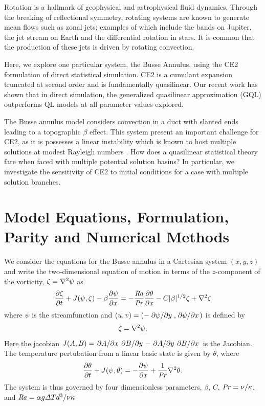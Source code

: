 \documentclass{jfm}
\newcommand{\Rayleigh}{\mbox{\textit{Ra}}}  %
\begin{document}
Rotation is a hallmark of geophysical and astrophysical fluid dynamics.
Through the breaking of reflectional symmetry, rotating systems are known to generate mean flows such as zonal jets; examples of which include the bands on Jupiter, the jet stream on Earth and the differential rotation in stars.
It is common that the production of these jets is driven by rotating convection.


Here, we explore one particular system, the Busse Annulus, using the CE2 formulation of direct statistical simulation.
CE2 is a cumulant expansion truncated at second order and is fundamentally quasilinear.
Our recent work \citep{2018RSPSA.47480422T} has shown that in direct simulation, the generalized quasilinear approximation (GQL) outperforms QL models at all parameter values explored.

The Busse annulus model considers convection in a duct with slanted ends leading to a topographic $\beta$ effect.
This system present an important challenge for CE2, as it is possesses a linear instability which is known to host multiple solutions at modest Rayleigh numbers \citep{bh1993}.
How does a quasilinear statistical theory fare when faced with multiple potential solution basins?
In particular, we investigate the sensitivity of CE2 to initial conditions for a case with multiple solution branches.

\section{Model Equations, Formulation, Parity and Numerical Methods}
\label{sec:model-eqations}

We consider the equations for the Busse annulus \citep[see e.g.][]{bh1993} in a Cartesian system $(x,y,z)$ and write the two-dimensional equation of motion in terms of the $z$-component of the vorticity, $\zeta = \laplacian{\psi}$ as
\begin{equation}
  \label{eq:zeta_eom}
  \pdv{\zeta}{t} + J(\psi, \zeta) - \beta \pdv{\psi}{x} = -\frac{\Rayleigh}{\Pran} \pdv{\theta}{x} -C |\beta|^{1/2} \zeta + \laplacian{\zeta}
\end{equation}
where $\psi$ is the streamfunction and $(u,v) = (-\pdv*{\psi}{y}, \pdv*{\psi}{x})$ is defined by
\begin{equation}
  \label{eq:zeta_def}
  \zeta = \laplacian{\psi},
\end{equation}
Here the jacobian $J(A, B) = \pdv*{A}{x}\pdv*{B}{y} - \pdv*{A}{y}\pdv*{B}{x}$ is the Jacobian. 
The temperature pertubation from a linear basic state is given by $\theta$, where
%
\begin{equation}
  \label{eq:theta}
  \pdv{\theta}{t} + J(\psi, \theta) = -\pdv{\psi}{x} + \frac{1}{\mbox{\textit{Pr}}} \nabla^2 \theta.
\end{equation}
The system is thus governed by four dimensionless parameters, $\beta$, $C$, $\mbox{\textit{Pr}} = \nu/
\kappa$, and $\Rayleigh = \alpha g \Delta T d^3/\nu \kappa$ \citep[see e.g.][]{rj2006}
\end{document}
